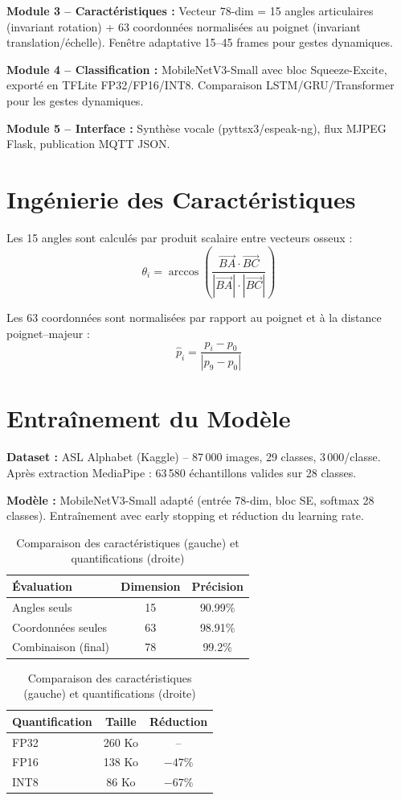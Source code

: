 \documentclass[11pt,a4paper]{article}
\begin{document}
\textbf{Module 3 -- Caractéristiques :} Vecteur 78-dim = 15 angles articulaires (invariant rotation) + 63 coordonnées normalisées au poignet (invariant translation/échelle). Fenêtre adaptative 15--45 frames pour gestes dynamiques.

\textbf{Module 4 -- Classification :} MobileNetV3-Small avec bloc Squeeze-Excite, exporté en TFLite FP32/FP16/INT8. Comparaison LSTM/GRU/Transformer pour les gestes dynamiques.

\textbf{Module 5 -- Interface :} Synthèse vocale (pyttsx3/espeak-ng), flux MJPEG Flask, publication MQTT JSON.

\section{Ingénierie des Caractéristiques}

Les 15 angles sont calculés par produit scalaire entre vecteurs osseux :
\begin{equation}
\theta_i = \arccos\left(\frac{\vec{BA} \cdot \vec{BC}}{|\vec{BA}| \cdot |\vec{BC}|}\right)
\end{equation}

Les 63 coordonnées sont normalisées par rapport au poignet et à la distance poignet--majeur :
\begin{equation}
\hat{p}_i = \frac{p_i - p_0}{|p_9 - p_0|}
\end{equation}

\section{Entraînement du Modèle}

\textbf{Dataset :} ASL Alphabet (Kaggle) -- 87\,000 images, 29 classes, 3\,000/classe. Après extraction MediaPipe : 63\,580 échantillons valides sur 28 classes.

\textbf{Modèle :} MobileNetV3-Small adapté (entrée 78-dim, bloc SE, softmax 28 classes). Entraînement avec early stopping et réduction du learning rate.

\begin{table}[H]
\centering\small
\begin{tabular}{lcc}
\toprule
\textbf{Évaluation} & \textbf{Dimension} & \textbf{Précision} \\
\midrule
Angles seuls & 15 & 90.99\% \\
Coordonnées seules & 63 & 98.91\% \\
Combinaison (final) & 78 & 99.2\% \\
\bottomrule
\end{tabular}
\quad
\begin{tabular}{lcc}
\toprule
\textbf{Quantification} & \textbf{Taille} & \textbf{Réduction} \\
\midrule
FP32 & 260 Ko & -- \\
FP16 & 138 Ko & $-47\%$ \\
INT8 & 86 Ko & $-67\%$ \\
\bottomrule
\end{tabular}
\caption{Comparaison des caractéristiques (gauche) et quantifications (droite)}
\end{table}
\end{document}
